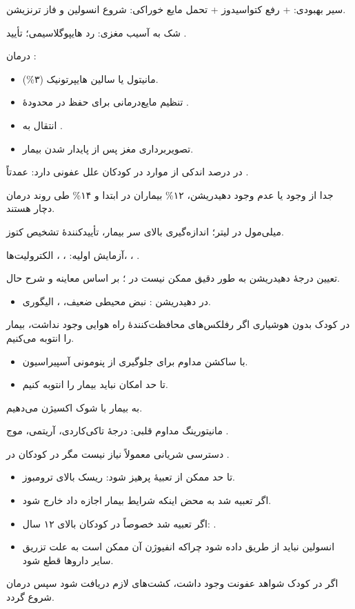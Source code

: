 \documentclass[12pt,a4paper]{article}
\begin{document}
سیر بهبودی:  + رفع کتواسیدوز + تحمل مایع خوراکی: شروع انسولین  و فاز ترنزیشن.

شک به آسیب مغزی: رد هایپوگلاسیمی؛ تأیید .

درمان :
\begin{itemize}
\item مانیتول  یا سالین هایپرتونیک (۳\%).
\item تنظیم مایع‌درمانی برای حفظ  در محدودهٔ .
\item انتقال به .
\item تصویربرداری مغز پس از پایدار شدن بیمار.
\end{itemize}

در درصد اندکی از موارد  در کودکان علل عفونی دارد: عمدتاً .

جدا از وجود یا عدم وجود دهیدریشن، ۱۲\% بیماران در ابتدا و ۱۴\% طی روند درمان دچار  هستند.

 میلی‌مول در لیتر؛ اندازه‌گیری بالای سر بیمار، تأییدکنندهٔ تشخیص کتوز.

آزمایش اولیه: ، ، الکترولیت‌ها، ، .

تعیین درجهٔ دهیدریشن به طور دقیق ممکن نیست در ؛ بر اساس معاینه و شرح حال.
\begin{itemize}
\item در دهیدریشن : نبض محیطی ضعیف، ، الیگوری.
\end{itemize}
در کودک بدون هوشیاری اگر رفلکس‌های محافظت‌کنندهٔ راه هوایی وجود نداشت، بیمار را انتوبه می‌کنیم.
\begin{itemize}
\item {} با ساکشن مداوم برای جلوگیری از پنومونی آسپیراسیون.
\item تا حد امکان نباید بیمار را انتوبه کنیم.
\end{itemize}
به بیمار با شوک اکسیژن می‌دهیم.

مانیتورینگ مداوم قلبی: درجهٔ تاکی‌کاردی، آریتمی، موج .

دسترسی شریانی معمولاً نیاز نیست مگر در کودکان  در .
\begin{itemize}
\item تا حد ممکن از تعبیهٔ  پرهیز شود: ریسک بالای ترومبوز.
\item اگر تعبیه شد به محض اینکه شرایط بیمار اجازه داد خارج شود.
\item اگر تعبیه شد خصوصاً در کودکان بالای ۱۲ سال: .
\item انسولین نباید از طریق  داده شود چراکه انفیوژن آن ممکن است به علت تزریق سایر داروها قطع شود.
\end{itemize}
اگر در کودک شواهد عفونت وجود داشت، کشت‌های لازم دریافت شود سپس درمان  شروع گردد.
\end{document}
